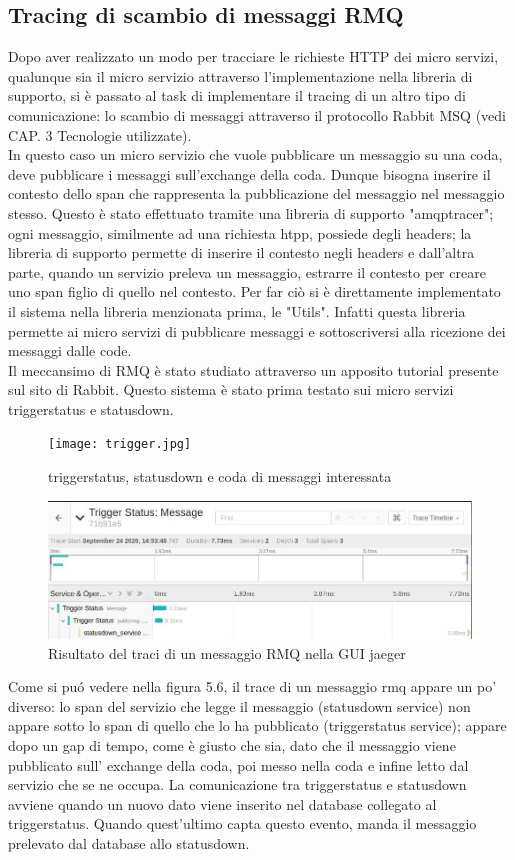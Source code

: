 \documentclass[a4paper,12pt,titlepage,italian,openany]{report}
\begin{document}
\subsection{Tracing di scambio di messaggi RMQ}
Dopo aver realizzato un modo per tracciare le richieste HTTP dei micro servizi, qualunque sia il micro servizio attraverso l'implementazione nella libreria di supporto, si è passato al task di implementare
il tracing di un altro tipo di comunicazione: lo scambio di messaggi attraverso il protocollo Rabbit MSQ (vedi CAP. 3 Tecnologie utilizzate).\\
In questo caso un micro servizio che vuole pubblicare un messaggio su una coda, deve pubblicare i messaggi sull'exchange della coda. Dunque bisogna  inserire il contesto dello span che rappresenta la pubblicazione del messaggio nel messaggio stesso. Questo è stato effettuato tramite una libreria di supporto "amqptracer"; ogni messaggio, similmente ad una richiesta htpp, possiede degli headers; la libreria di supporto permette di inserire il contesto negli headers e dall'altra parte, quando un servizio preleva un messaggio, estrarre il contesto per creare uno span figlio di quello nel contesto.
Per far ciò si è direttamente implementato il sistema nella libreria menzionata prima, le "Utils". Infatti questa libreria permette ai micro servizi di pubblicare messaggi e sottoscriversi alla ricezione dei messaggi dalle code.\\
Il meccansimo di RMQ è stato studiato attraverso un apposito tutorial\cite{rabbit:2} presente sul sito di Rabbit.
Questo sistema è stato prima testato sui micro servizi triggerstatus e statusdown.
\begin{figure}[H]
    \texttt{[image: trigger.jpg]}
    \centering
    \caption{triggerstatus, statusdown e coda di messaggi interessata}
\end{figure} 

\begin{figure}[H]
    \includegraphics[scale=0.5]{45.jpg}
    \centering
    \caption{Risultato del traci di un messaggio RMQ\cite{rabbit:1} nella GUI jaeger}
\end{figure}
Come si puó vedere nella figura 5.6, il trace di un messaggio rmq appare un po' diverso: lo span del servizio che legge il messaggio (statusdown service) non appare sotto lo span di quello che lo ha pubblicato (triggerstatus service); appare dopo un gap di tempo, come è giusto che sia, dato che il messaggio viene pubblicato sull' exchange della coda, poi messo nella coda e infine letto dal servizio che se ne occupa.
La comunicazione tra triggerstatus e statusdown avviene quando un nuovo dato viene inserito nel database collegato al triggerstatus. Quando quest'ultimo capta questo evento, manda il messaggio prelevato dal database allo statusdown.
\end{document}
